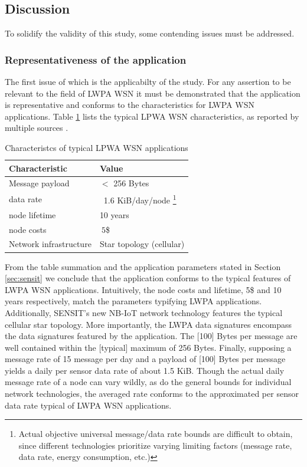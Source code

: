 \subsection{Discussion}
To solidify the validity of this study, some contending issues must be addressed. 

\subsubsection{Representativeness of the \sensit application}
The first issue of which is the applicabilty of the study. For any assertion to be relevant to the field of LWPA WSN it must be demonstrated that the \sensit application is representative and conforms to the characteristics for LWPA WSN applications. Table \ref{table:lpwa-chars} lists the typical LPWA WSN characteristics, as reported by multiple sources \cite{lora-vs-sigfox-boek, lora-vs-sigfox-whitepaper, lora-vs-nbiot-vs-sigfox, lora-vs-sigfox, whitepaper-tmobile, nbiot}.

\begin{table}
\centering
\begin{tabular}{|l|l|}\hline
Characteristic & Value \\ \hline
Message payload & $<$ 256 Bytes	\\ \hline
data rate &	~1.6 KiB/day/node \footnote{Actual objective universal message/data rate bounds are difficult to obtain, since different technologies prioritize varying limiting factors (message rate, data rate, energy consumption, etc.)}  \\ \hline
node lifetime & 10 years \\ \hline
node costs & $~5$\$ \\ \hline
Network infrastructure & Star topology (cellular)	\\ \hline
\end{tabular}
\caption{Characteristcs of typical LPWA WSN applications}
\label{table:lpwa-chars}
\end{table}

From the table summation and the application parameters stated in Section \ref{sec:sensit} we conclude that the \sensit application conforms to the typical features of LWPA WSN applications. Intuitively, the node costs and lifetime, 5\$ and 10 years respectively, match the parameters typifying LWPA applications. Additionally, SENSIT's new NB-IoT network technology features the typical cellular star topology. More importantly, the LWPA data signatures encompass the data signatures featured by the \sensit application. The [100] Bytes per message are well contained within the [typical] maximum of 256 Bytes. Finally, supposing a message rate of 15 message per day and a payload of [100] Bytes per message yields a daily per sensor data rate of about 1.5 KiB. Though the actual daily message rate of a node can vary wildly, as do the general bounds for individual network technologies, the averaged rate conforms to the approximated per sensor data rate typical of LWPA WSN applications.

